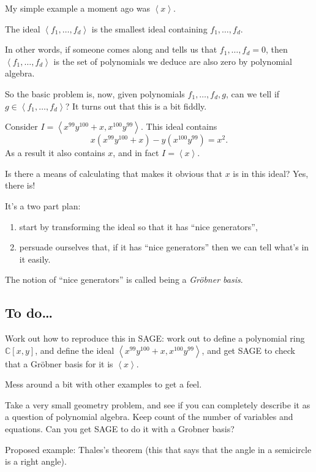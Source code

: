\documentclass[a4paper, 14pt]{extarticle}
\newcommand{\bC}{\mathbb{C}}
\begin{document}
My simple example a moment ago was $\left<x\right>$.

The ideal $\left<f_1,\ldots,f_d\right>$ is the smallest ideal
containing $f_1,\ldots,f_d$.

In other words, if someone comes along and tells us that
$f_1,\ldots,f_d=0$, then $\left<f_1,\ldots,f_d\right>$ is the set of
polynomials we deduce are also zero by polynomial algebra.

So the basic problem is, now, given polynomials $f_1,\ldots,f_d,g$,
can we tell if $g\in\left<f_1,\ldots,f_d\right>$? It turns out that
this is a bit fiddly.

Consider $I = \left<x^{99}y^{100}+x, x^{100}y^{99}\right>$. This ideal contains
\[x(x^{99}y^{100}+x) - y(x^{100}y^{99}) = x^2.\]
As a result it also contains $x$, and in fact $I = \left<x\right>$.

Is there a means of calculating that makes it obvious that $x$ is in
this ideal? Yes, there is!

It's a two part plan:
\begin{enumerate}
\item start by transforming the ideal so that it has ``nice
  generators'',
\item persuade ourselves that, if it has ``nice generators'' then we
  can tell what's in it easily.
\end{enumerate}

The notion of ``nice generators'' is called being a \emph{Gr\"obner
  basis}.

\subsection*{To do\ldots}

Work out how to reproduce this in SAGE: work out to define a
polynomial ring $\bC[x,y]$, and define the ideal
$\left<x^{99}y^{100}+x, x^{100}y^{99}\right>$, and get SAGE to check
that a Gr\"obner basis for it is $\left<x\right>$.

Mess around a bit with other examples to get a feel.

Take a very small geometry problem, and see if you can completely
describe it as a question of polynomial algebra. Keep count of the
number of variables and equations. Can you get SAGE to do it with a
Grobner basis?

Proposed example: Thales's theorem (this that says that the angle in a
semicircle is a right angle).
\end{document}
